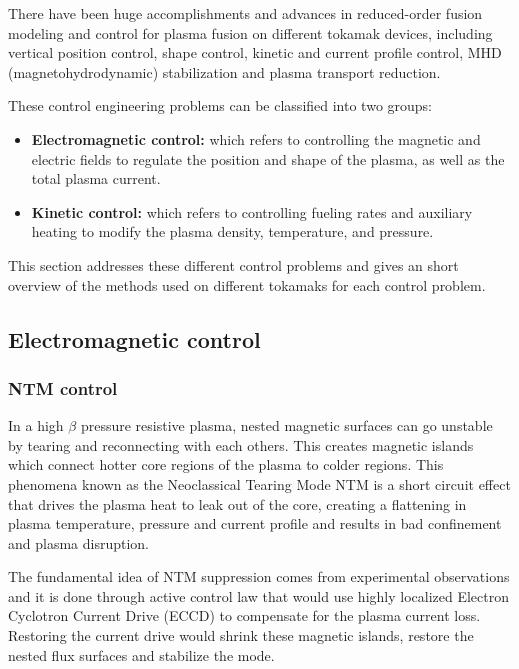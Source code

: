 \documentclass[12pt,lot, lof]{puthesis}
\begin{document}
There have been huge accomplishments and advances in reduced-order fusion modeling and control for plasma fusion on different tokamak devices, including vertical position control, shape control, kinetic and current profile control, MHD (magnetohydrodynamic) stabilization and plasma transport reduction.

These control engineering problems can be classified into two groups: 
\begin{itemize}
\item \textbf{Electromagnetic control:} which refers to controlling the magnetic and electric fields to regulate the position and shape of the plasma, as well as the total plasma current. 

\item \textbf{Kinetic control:} which refers to controlling fueling rates and auxiliary heating to modify the plasma density, temperature, and pressure.
\end{itemize}
This section addresses these different control problems and gives an short overview of the methods used on different tokamaks for each control problem.

\subsection{Electromagnetic control}

\subsubsection{NTM control}
In a high $\beta$ pressure resistive plasma, nested magnetic surfaces can go unstable by tearing and reconnecting with each others. This creates magnetic islands which connect hotter core regions of the plasma to colder regions. This phenomena known as the Neoclassical Tearing Mode NTM is a short circuit effect that drives the plasma heat to leak out of the core, creating a flattening in plasma temperature, pressure and current profile and results in bad confinement and plasma disruption.

The fundamental idea of NTM suppression comes from experimental observations and it is done through active control law that would use highly localized Electron Cyclotron Current Drive (ECCD) to compensate for the plasma current loss. Restoring the current drive would shrink these magnetic islands, restore the nested flux surfaces and stabilize the mode.
\end{document}
